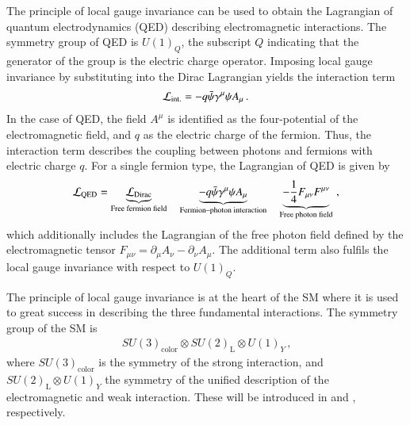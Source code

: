 The principle of local gauge invariance can be used to obtain the Lagrangian of
quantum electrodynamics (QED) describing electromagnetic interactions. The
symmetry group of QED is $U(1)_{Q}$, the subscript $Q$ indicating that the
generator of the group is the electric charge operator. Imposing local gauge
invariance by substituting  into the Dirac
Lagrangian yields the interaction term
\begin{align*}
  \mathcal{L}_{\text{int.}} = - q \bar{\psi} \gamma^\mu \psi A_\mu \,\text{.}
\end{align*}
In the case of QED, the field $A^\mu$ is identified as the four-potential of the
electromagnetic field, and $q$ as the electric charge of the fermion.
Thus, the interaction term describes the coupling between photons and fermions
with electric charge $q$. For a single fermion type, the Lagrangian of QED is
given by
\begin{align*}
  \mathcal{L}_{\text{QED}} = \underbrace{\mathcal{L}_{\text{Dirac}}}_{\text{Free fermion field}}
  \hspace*{1em}
  \underbrace{- q \bar{\psi} \gamma^\mu \psi A_\mu}_{\text{Fermion--photon interaction}}
  \hspace*{1em}
  \underbrace{- \frac{1}{4} F_{\mu\nu} F^{\mu\nu}}_{\text{Free photon field}} \,\text{,}
\end{align*}
which additionally includes the Lagrangian of the free photon field defined by
the electromagnetic tensor
$F_{\mu\nu} = \partial_\mu A_\nu - \partial_\nu A_\mu$. The additional term also
fulfils the local gauge invariance with respect to $U(1)_Q$.

The principle of local gauge invariance is at the heart of the SM where it is
used to great success in describing the three fundamental interactions. The
symmetry group of the SM is
\begin{align*}
  SU(3)_{\text{color}} \otimes SU(2)_{\text{L}} \otimes U(1)_Y \,\text{,}
\end{align*}
where $SU(3)_{\text{color}}$ is the symmetry of the strong interaction, and
$SU(2)_{\text{L}} \otimes U(1)_Y$ the symmetry of the unified description of the
electromagnetic and weak interaction. These will be introduced in
 and , respectively.


